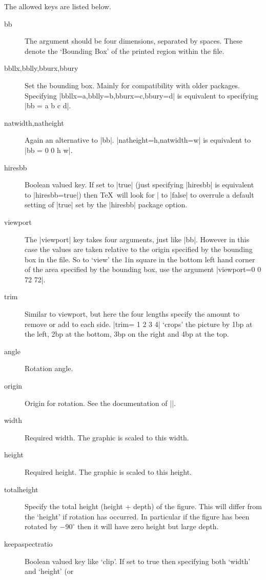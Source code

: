 The allowed keys are listed below.
\begin{description}
\item[bb] The argument should be four dimensions, separated by spaces.
  These denote the `Bounding Box' of the printed region within
  the file.
\item[bbllx,bblly,bburx,bbury] Set the bounding box. Mainly for
 compatibility with older packages.
 Specifying |bbllx=a,bblly=b,bburx=c,bbury=d|
 is equivalent to specifying |bb = a b c d|.
\item[natwidth,natheight] Again an alternative to |bb|. 
 |natheight=h,natwidth=w| is equivalent to |bb = 0 0 h w|.
\item[hiresbb]
 Boolean valued key. If set to |true| (just specifying |hiresbb|
 is equivalent to |hiresbb=true|) then \TeX\ will look for
 |%
 to |false| to overrule a default setting of |true| set by the
 |hiresbb| package option.
\item[viewport]
 The |viewport| key takes four arguments, just like
 |bb|. However in this case the values are taken relative to the
 origin specified by the bounding box in the file. So to `view' the
 1in square in the bottom left hand corner of the area specified by
 the bounding box, use the argument |viewport=0 0 72 72|.
\item[trim]
 Similar to viewport, but here the four lengths specify the
 amount to remove or add to each side. |trim= 1 2 3 4| `crops' the
 picture by 1bp at the left, 2bp at the bottom, 3bp on the right and
 4bp at the top.
\item[angle] Rotation angle.
\item[origin]
 Origin for rotation. See the documentation of |\rotatebox|.
\item[width] Required width. The
  graphic is scaled to this width.
\item[height] Required height. The
  graphic is scaled to this height.
\item[totalheight]
 Specify the total height (height $+$ depth) of the figure.
 This will differ from the `height' if rotation has occurred.
 In particular if the figure has been rotated by $-90^\circ$ 
 then it will have zero height but large depth.
\item[keepaspectratio]
 Boolean valued key like `clip'.
 If set to true then specifying both `width' and `height' (or

\end{description}
